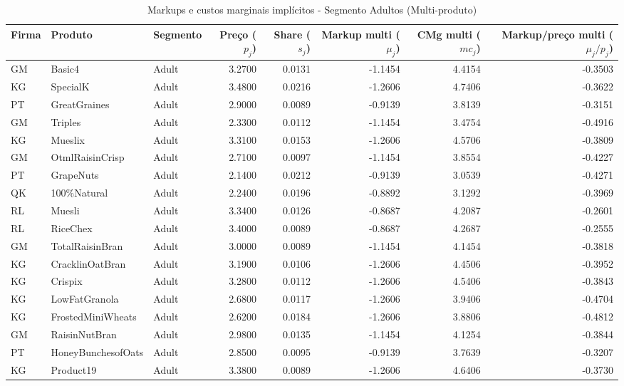 \begingroup
\begin{table}[H]
\centering
\caption{Markups e custos marginais implícitos - Segmento Adultos (Multi-produto)}
\label{tab:markups-adult-multi}
\scriptsize
\setlength{\tabcolsep}{3pt}
\renewcommand{\arraystretch}{1.05}
\begin{tabular}{@{}llp{}rrrrr@{}}
\toprule
Firma & Produto & Segmento & Preço ($p_j$) & Share ($s_j$) & Markup multi ($\mu_j$) & CMg multi ($mc_j$) & Markup/preço multi ($\mu_j/p_j$) \\
\midrule
GM & Basic4 & Adult & 3.2700 & 0.0131 & -1.1454 & 4.4154 & -0.3503 \\
KG & SpecialK & Adult & 3.4800 & 0.0216 & -1.2606 & 4.7406 & -0.3622 \\
PT & GreatGraines & Adult & 2.9000 & 0.0089 & -0.9139 & 3.8139 & -0.3151 \\
GM & Triples & Adult & 2.3300 & 0.0112 & -1.1454 & 3.4754 & -0.4916 \\
KG & Mueslix & Adult & 3.3100 & 0.0153 & -1.2606 & 4.5706 & -0.3809 \\
GM & OtmlRaisinCrisp & Adult & 2.7100 & 0.0097 & -1.1454 & 3.8554 & -0.4227 \\
PT & GrapeNuts & Adult & 2.1400 & 0.0212 & -0.9139 & 3.0539 & -0.4271 \\
QK & 100\%Natural & Adult & 2.2400 & 0.0196 & -0.8892 & 3.1292 & -0.3969 \\
RL & Muesli & Adult & 3.3400 & 0.0126 & -0.8687 & 4.2087 & -0.2601 \\
RL & RiceChex & Adult & 3.4000 & 0.0089 & -0.8687 & 4.2687 & -0.2555 \\
GM & TotalRaisinBran & Adult & 3.0000 & 0.0089 & -1.1454 & 4.1454 & -0.3818 \\
KG & CracklinOatBran & Adult & 3.1900 & 0.0106 & -1.2606 & 4.4506 & -0.3952 \\
KG & Crispix & Adult & 3.2800 & 0.0112 & -1.2606 & 4.5406 & -0.3843 \\
KG & LowFatGranola & Adult & 2.6800 & 0.0117 & -1.2606 & 3.9406 & -0.4704 \\
KG & FrostedMiniWheats & Adult & 2.6200 & 0.0184 & -1.2606 & 3.8806 & -0.4812 \\
GM & RaisinNutBran & Adult & 2.9800 & 0.0135 & -1.1454 & 4.1254 & -0.3844 \\
PT & HoneyBunchesofOats & Adult & 2.8500 & 0.0095 & -0.9139 & 3.7639 & -0.3207 \\
KG & Product19 & Adult & 3.3800 & 0.0089 & -1.2606 & 4.6406 & -0.3730 \\

\end{tabular}
\end{table}
